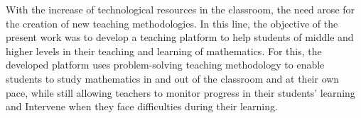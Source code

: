 With the increase of technological resources in the classroom, the need arose for the creation of new teaching methodologies. In this line, the objective of the present work was to develop a teaching platform to help students of middle and higher levels in their teaching and learning of mathematics. For this, the developed platform uses problem-solving teaching methodology to enable students to study mathematics in and out of the classroom and at their own pace, while still allowing teachers to monitor progress in their students' learning and Intervene when they face difficulties during their learning.

